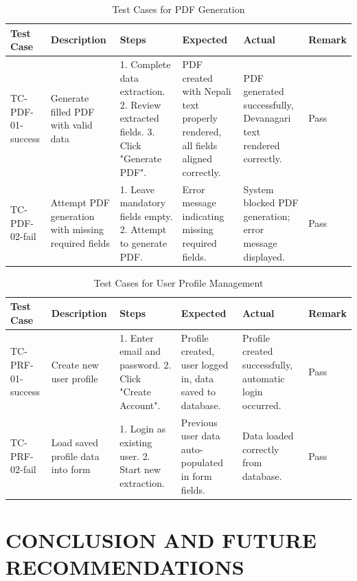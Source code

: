 \documentclass[12pt]{report}
\begin{document}
\begin{table}[H]
\centering
\caption{Test Cases for PDF Generation}
\label{tab:test_pdf}
\begin{tabular}{|p{1.5cm}|p{2.8cm}|p{3cm}|p{3cm}|p{2.8cm}|p{1.4cm}|}
\hline
\textbf{Test Case} & \textbf{Description} & \textbf{Steps} & \textbf{Expected} & \textbf{Actual} & \textbf{Remark} \\
\hline
TC-PDF-01-success &
Generate filled PDF with valid data &
1. Complete data extraction.
2. Review extracted fields.
3. Click "Generate PDF". &
PDF created with Nepali text properly rendered, all fields aligned correctly. &
PDF generated successfully, Devanagari text rendered correctly. &
Pass \\
\hline
TC-PDF-02-fail &
Attempt PDF generation with missing required fields &
1. Leave mandatory fields empty.
2. Attempt to generate PDF. &
Error message indicating missing required fields. &
System blocked PDF generation; error message displayed. &
Pass \\
\hline
\end{tabular}
\end{table}

\begin{table}[H]
\centering
\caption{Test Cases for User Profile Management}
\label{tab:test_profile}
\begin{tabular}{|p{1.5cm}|p{2.8cm}|p{3cm}|p{3cm}|p{2.8cm}|p{1.4cm}|}
\hline
\textbf{Test Case} & \textbf{Description} & \textbf{Steps} & \textbf{Expected} & \textbf{Actual} & \textbf{Remark} \\
\hline
TC-PRF-01-success &
Create new user profile &
1. Enter email and password.
2. Click "Create Account". &
Profile created, user logged in, data saved to database. &
Profile created successfully, automatic login occurred. &
Pass \\
\hline
TC-PRF-02-fail &
Load saved profile data into form &
1. Login as existing user.
2. Start new extraction. &
Previous user data auto-populated in form fields. &
Data loaded correctly from database. &
Pass \\
\hline
\end{tabular}
\end{table}
\newpage
\chapter{CONCLUSION AND FUTURE RECOMMENDATIONS}
\end{document}
